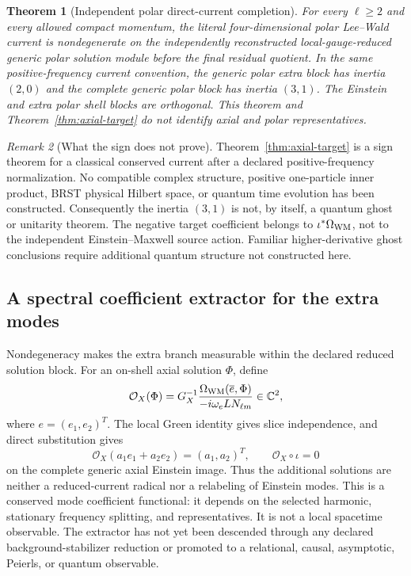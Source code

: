 \documentclass[11pt]{article}
\newtheorem{theorem}{Theorem}[section]
\theoremstyle{remark}
\newtheorem{remark}[theorem]{Remark}
\newcommand{\C}{\mathbb C}
\newcommand{\cO}{\mathcal O}
\begin{document}
\begin{theorem}[Independent polar direct-current completion]
\label{thm:polar-target}
For every $\ell\geq2$ and every allowed compact momentum, the literal
four-dimensional polar Lee--Wald current is nondegenerate on the independently
reconstructed local-gauge-reduced generic polar solution module before the final residual quotient.
In the same positive-frequency current convention,
the generic polar extra block has inertia $(2,0)$ and the complete generic
polar block has inertia $(3,1)$. The Einstein and extra polar shell blocks are
orthogonal. This theorem and Theorem~\ref{thm:axial-target} do not identify
axial and polar representatives.
\end{theorem}

\begin{remark}[What the sign does not prove]
Theorem~\ref{thm:axial-target} is a sign theorem for a classical conserved
current after a declared positive-frequency normalization. No compatible
complex structure, positive one-particle inner product, BRST physical Hilbert
space, or quantum time evolution has been constructed. Consequently the
inertia $(3,1)$ is not, by itself, a quantum ghost or unitarity theorem.
The negative target coefficient belongs to $\iota^*\Omega_{\rm WM}$, not to
the independent Einstein--Maxwell source action. Familiar higher-derivative
ghost conclusions \cite{Stelle} require additional quantum structure not
constructed here.
\end{remark}

\subsection{A spectral coefficient extractor for the extra modes}
Nondegeneracy makes the extra branch measurable within the declared reduced
solution block. For an on-shell axial solution $\Phi$, define
\begin{equation}\label{eq:detector}
 \cO_X(\Phi)
 =G_X^{-1}\frac{\Omega_{\rm WM}(\overline e,\Phi)}
 {-i\omega_eL N_{\ell m}}\in\C^2,
\end{equation}
where $e=(e_1,e_2)^T$. The local Green identity gives slice independence, and
direct substitution gives
\begin{equation}
 \cO_X(a_1e_1+a_2e_2)=(a_1,a_2)^T,\qquad \cO_X\circ\iota=0
\end{equation}
on the complete generic axial Einstein image. Thus the additional solutions
are neither a reduced-current radical nor a relabeling of Einstein modes.
This is a conserved mode coefficient functional: it depends on the selected
harmonic, stationary frequency splitting, and representatives. It is not a
local spacetime observable. The extractor has not yet been descended through
any declared background-stabilizer reduction or promoted to a relational,
causal, asymptotic,
Peierls, or quantum observable.
\end{document}
